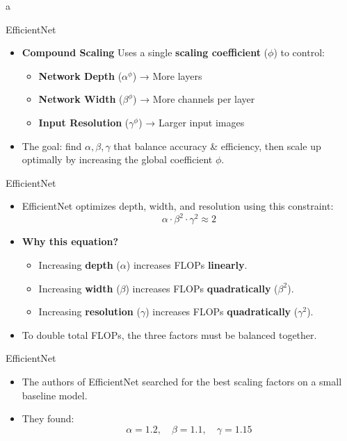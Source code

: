 a\documentclass[10pt]{beamer}
\theoremstyle{remark}
\theoremstyle{definition}
\begin{document}
\begin{frame}{EfficientNet}
    \begin{itemize}
        \item \textbf{Compound Scaling} Uses a single \textbf{scaling coefficient} (\(\phi\)) to control:
        \begin{itemize}
        \item \textbf{Network Depth} (\(\alpha^\phi\)) → More layers
        \item \textbf{Network Width} (\(\beta^\phi\)) → More channels per layer
        \item \textbf{Input Resolution} (\(\gamma^\phi\)) → Larger input images
    \end{itemize}
        \item The goal: find \(\alpha, \beta, \gamma\) that balance accuracy \& efficiency, then scale up optimally by increasing the global coefficient \(\phi\).
    \end{itemize}

\end{frame}

\begin{frame}{EfficientNet}
\begin{itemize}
    \item EfficientNet optimizes depth, width, and resolution using this constraint:
    \[
    \alpha \cdot \beta^2 \cdot \gamma^2 \approx 2
    \]
    \item \textbf{Why this equation?}
    \begin{itemize}
        \item Increasing \textbf{depth} (\(\alpha\)) increases FLOPs \textbf{linearly}.
        \item Increasing \textbf{width} (\(\beta\)) increases FLOPs \textbf{quadratically} (\(\beta^2\)).
        \item Increasing \textbf{resolution} (\(\gamma\)) increases FLOPs \textbf{quadratically} (\(\gamma^2\)).
    \end{itemize}
    \item To double total FLOPs, the three factors must be balanced together.
\end{itemize}
\end{frame}



\begin{frame}{EfficientNet}
\begin{itemize}
    \item The authors of EfficientNet searched for the best scaling factors on a small baseline model.
    \item They found:
    \[
    \alpha = 1.2, \quad \beta = 1.1, \quad \gamma = 1.15
    \]
\end{itemize}
\end{frame}
\end{document}
